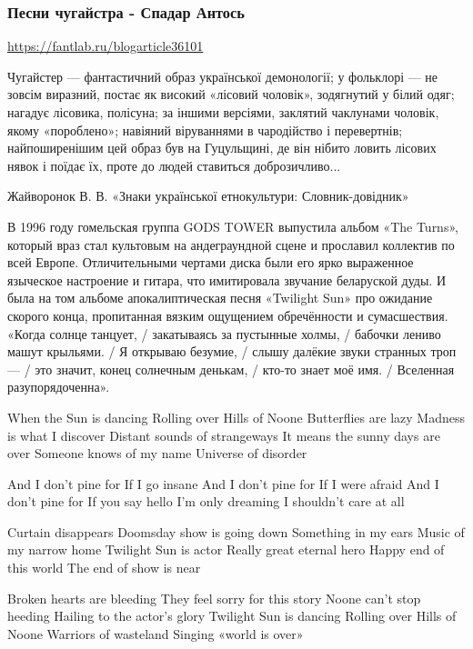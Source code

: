  
 

\subsubsection{Песни чугайстра - Спадар Антось}

\url{https://fantlab.ru/blogarticle36101}

Чугайстер — фантастичний образ української демонології; у фольклорі — не зовсім
виразний, постає як високий «лісовий чоловік», зодягнутий у білий одяг; нагадує
лісовика, полісуна; за іншими версіями, заклятий чаклунами чоловік, якому
«пороблено»; навіяний віруваннями в чародійство і перевертнів; найпоширенішим
цей образ був на Гуцульщині, де він нібито ловить лісових нявок і поїдає їх,
проте до людей ставиться доброзичливо...

Жайворонок В. В. «Знаки української етнокультури: Словник-довідник»

В 1996 году гомельская группа GODS TOWER выпустила альбом «The Turns», который
враз стал культовым на андеграундной сцене и прославил коллектив по всей
Европе. Отличительными чертами диска были его ярко выраженное языческое
настроение и гитара, что имитировала звучание беларуской дуды. И была на том
альбоме апокалиптическая песня «Twilight Sun» про ожидание скорого конца,
пропитанная вязким ощущением обречённости и сумасшествия. «Когда солнце
танцует, / закатываясь за пустынные холмы, / бабочки лениво машут крыльями. / Я
открываю безумие, / слышу далёкие звуки странных троп — / это значит, конец
солнечным денькам, / кто-то знает моё имя. / Вселенная разупорядоченна».

When the Sun is dancing
Rolling over Hills of Noone
Butterflies are lazy
Madness is what I discover
Distant sounds of strangeways
It means the sunny days are over
Someone knows of my name
Universe of disorder

And I don't pine for
If I go insane
And I don't pine for
If I were afraid
And I don't pine for
If you say hello
I'm only dreaming
I shouldn't care at all

Curtain disappears
Doomsday show is going down
Something in my ears
Music of my narrow home
Twilight Sun is actor
Really great eternal hero
Happy end of this world
The end of show is near

Broken hearts are bleeding
They feel sorry for this story
Noone can't stop heeding
Hailing to the actor's glory
Twilight Sun is dancing
Rolling over Hills of Noone
Warriors of wasteland
Singing «world is over»

